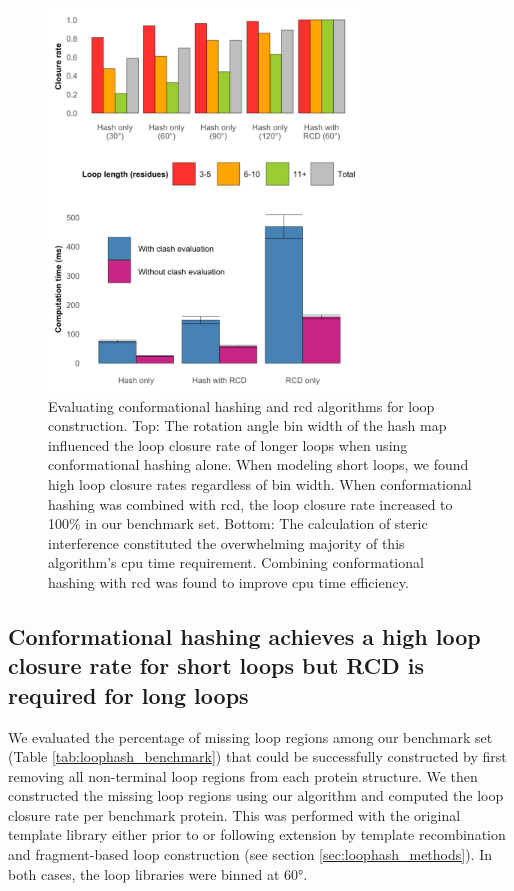 \begin{figure}
\centering
\includegraphics[width=3.25in]{Figures/loophash_closurerate.pdf}
 \caption[Evaluating conformational hashing and \gls{rcd} algorithms for loop construction.]{Evaluating conformational hashing and \gls{rcd} algorithms for loop construction. Top: The rotation angle bin width of the hash map influenced the loop closure rate of longer loops when using conformational hashing alone. When modeling short loops, we found high loop closure rates regardless of bin width. When conformational hashing was combined with \gls{rcd}, the loop closure rate increased to 100\% in our benchmark set. Bottom: The calculation of steric interference constituted the overwhelming majority of this algorithm's \gls{cpu} time requirement. Combining conformational hashing with \gls{rcd} was found to improve \gls{cpu} time efficiency.}
\label{fig:loophash_closurerate}
\end{figure}
 
\subsection{Conformational hashing achieves a high loop closure rate for short loops but RCD is required for long loops}

We evaluated the percentage of missing loop regions among our benchmark set (Table \ref{tab:loophash_benchmark}) that could be successfully constructed by first removing all non-terminal loop regions from each protein structure. We then constructed the missing loop regions using our algorithm and computed the loop closure rate per benchmark protein. This was performed with the original template library either prior to or following extension by template recombination and fragment-based loop construction (see section \ref{sec:loophash_methods}). In both cases, the loop libraries were binned at 60°.

